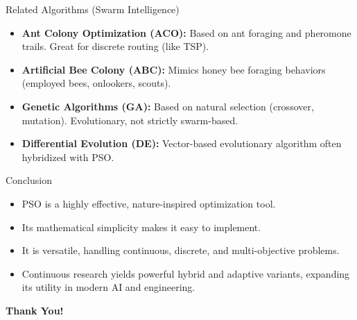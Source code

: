 \documentclass{beamer}
\begin{document}
\begin{frame}{Related Algorithms (Swarm Intelligence)}
    \begin{itemize}
        \item \textbf{Ant Colony Optimization (ACO):} Based on ant foraging and pheromone trails. Great for discrete routing (like TSP).
        \item \textbf{Artificial Bee Colony (ABC):} Mimics honey bee foraging behaviors (employed bees, onlookers, scouts).
        \item \textbf{Genetic Algorithms (GA):} Based on natural selection (crossover, mutation). Evolutionary, not strictly swarm-based.
        \item \textbf{Differential Evolution (DE):} Vector-based evolutionary algorithm often hybridized with PSO.
    \end{itemize}
\end{frame}
\begin{frame}{Conclusion}
    \begin{itemize}
        \item PSO is a highly effective, nature-inspired optimization tool.
        \item Its mathematical simplicity makes it easy to implement.
        \item It is versatile, handling continuous, discrete, and multi-objective problems.
        \item Continuous research yields powerful hybrid and adaptive variants, expanding its utility in modern AI and engineering.
    \end{itemize}
    \vspace{1cm}
    \begin{center}
        \Large \textbf{Thank You!}
    \end{center}
\end{frame}
\end{document}

